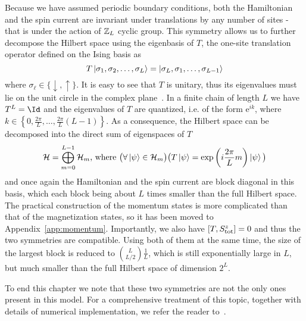 Because we have assumed periodic boundary conditions, both the Hamiltonian and the spin current
are invariant under translations by any number of sites - that is under the action of \(\mathbb{Z}_L\) cyclic group.
This symmetry allows us to further decompose the Hilbert space
using the eigenbasis of \(T\), the one-site translation operator defined on the Ising basis as
\begin{equation}
    T \ket{\sigma_1,\sigma_2,\ldots,\sigma_L} = \ket{\sigma_L,\sigma_1,\ldots,\sigma_{L-1}}
\end{equation}
where \(\sigma_{\ell} \in \{\downarrow, \uparrow\}\). It is easy to see that \(T\) is unitary,
thus its eigenvalues must lie on the unit circle in the complex plane~\autocite{Horn2012}.
In a finite chain of length \(L\) we have \(T^L = \Id\) and the eigenvalues of \(T\) are
quantized, i.e. of the form \(\mathrm{e}^{i k}\), where \(k \in \left\{0,\frac{2\pi}{L},\ldots,\frac{2\pi}{L}(L-1)\right\}\).
As a consequence, the Hilbert space can be decomposed into the direct sum of eigenspaces of \(T\)
\begin{equation}
    \mathcal{H} = \bigoplus_{m=0}^{L-1} \mathcal{H}_m \text{, where } \big(\forall \ket{\psi} \in \mathcal{H}_m \big) \big(T \ket{\psi} = \exp\left({i \frac{2\pi}{L}m}\right) \ket{\psi}\big)
\end{equation}
and once again the Hamiltonian and the spin current are block diagonal in this basis, which each block being
about \(L\) times smaller than the full Hilbert space.
The practical construction of the momentum states is more complicated than that of the magnetization states,
 so it has been moved to Appendix~\ref{app:momentum}.
Importantly, we also have \(\comm{T}{\Sz_{\mathrm{tot}}}=0\) and thus the two symmetries are compatible.
Using both of them at the same time, the size of the largest block is reduced to \(\binom{L}{L/2}\frac{1}{L}\), which is
still exponentially large in \(L\), but much smaller than the full Hilbert space of dimension \(2^L\). 

To end this chapter we note that these two symmetries are not the only ones present in this model. 
For a comprehensive treatment of this topic, together with details of numerical implementation, we refer the reader to~\textcite{Sandvik2010}.
